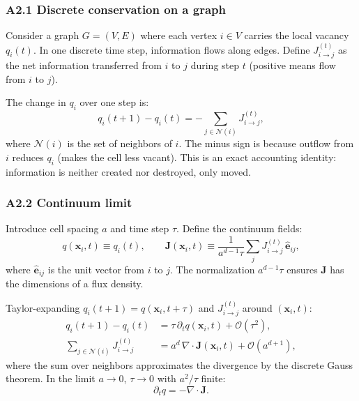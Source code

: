 \documentclass[reprint]{revtex4-2}
\begin{document}
\subsubsection{A2.1 Discrete conservation on a graph}

Consider a graph $G=(V,E)$ where each vertex $i\in V$ carries the local vacancy $q_i(t)$. In one discrete time step, information flows along edges. Define $J_{i\to j}^{(t)}$ as the net information transferred from $i$ to $j$ during step $t$ (positive means flow from $i$ to $j$).

The change in $q_i$ over one step is:
\begin{equation}
q_i(t+1) - q_i(t) = -\sum_{j\in\mathcal{N}(i)} J_{i\to j}^{(t)},
\end{equation}
where $\mathcal{N}(i)$ is the set of neighbors of $i$. The minus sign is because outflow from $i$ reduces $q_i$ (makes the cell less vacant). This is an exact accounting identity: information is neither created nor destroyed, only moved.

\subsubsection{A2.2 Continuum limit}

Introduce cell spacing $a$ and time step $\tau$. Define the continuum fields:
\begin{equation}
q(\mathbf{x}_i, t) \equiv q_i(t), \qquad \mathbf{J}(\mathbf{x}_i, t) \equiv \frac{1}{a^{d-1}\tau}\sum_{j} J_{i\to j}^{(t)}\,\hat{\mathbf{e}}_{ij},
\end{equation}
where $\hat{\mathbf{e}}_{ij}$ is the unit vector from $i$ to $j$. The normalization $a^{d-1}\tau$ ensures $\mathbf{J}$ has the dimensions of a flux density.

Taylor-expanding $q_i(t+1) = q(\mathbf{x}_i, t+\tau)$ and $J_{i\to j}^{(t)}$ around $(\mathbf{x}_i, t)$:
\begin{align}
q_i(t+1) - q_i(t) &= \tau\,\partial_t q(\mathbf{x}_i,t) + \mathcal{O}(\tau^2),\\
\sum_{j\in\mathcal{N}(i)} J_{i\to j}^{(t)} &= a^d\,\nabla\cdot\mathbf{J}(\mathbf{x}_i,t) + \mathcal{O}(a^{d+1}),
\end{align}
where the sum over neighbors approximates the divergence by the discrete Gauss theorem. In the limit $a\to 0$, $\tau\to 0$ with $a^2/\tau$ finite:
\begin{equation}
\boxed{\partial_t q = -\nabla\cdot\mathbf{J}}.
\end{equation}
\end{document}
